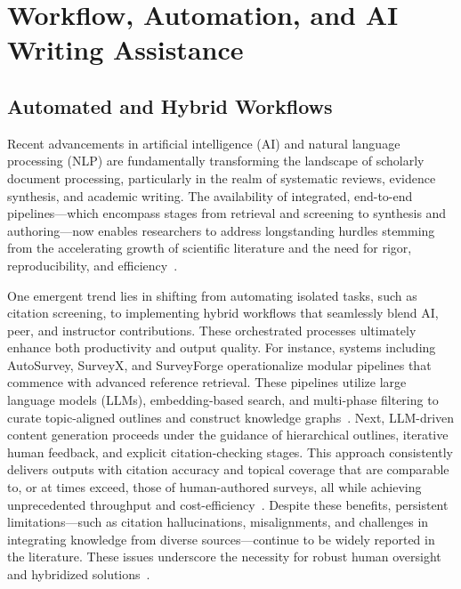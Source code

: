 \section{Workflow, Automation, and AI Writing Assistance}

\subsection{Automated and Hybrid Workflows}

Recent advancements in artificial intelligence (AI) and natural language processing (NLP) are fundamentally transforming the landscape of scholarly document processing, particularly in the realm of systematic reviews, evidence synthesis, and academic writing. The availability of integrated, end-to-end pipelines—which encompass stages from retrieval and screening to synthesis and authoring—now enables researchers to address longstanding hurdles stemming from the accelerating growth of scientific literature and the need for rigor, reproducibility, and efficiency~\cite{ref10,ref11,ref12,ref28,ref29,ref30,ref31,ref35,ref36,ref37,ref38,ref39,ref46,ref47,ref49,ref51,ref62,ref76,ref80,ref86,ref88,ref89,ref90,ref91,ref94,ref96,ref97,ref98,ref102,ref108}.

One emergent trend lies in shifting from automating isolated tasks, such as citation screening, to implementing hybrid workflows that seamlessly blend AI, peer, and instructor contributions. These orchestrated processes ultimately enhance both productivity and output quality. For instance, systems including AutoSurvey, SurveyX, and SurveyForge operationalize modular pipelines that commence with advanced reference retrieval. These pipelines utilize large language models (LLMs), embedding-based search, and multi-phase filtering to curate topic-aligned outlines and construct knowledge graphs~\cite{ref10,ref12,ref35,ref76}. Next, LLM-driven content generation proceeds under the guidance of hierarchical outlines, iterative human feedback, and explicit citation-checking stages. This approach consistently delivers outputs with citation accuracy and topical coverage that are comparable to, or at times exceed, those of human-authored surveys, all while achieving unprecedented throughput and cost-efficiency~\cite{ref10,ref12,ref29,ref35,ref46,ref51}. Despite these benefits, persistent limitations—such as citation hallucinations, misalignments, and challenges in integrating knowledge from diverse sources—continue to be widely reported in the literature. These issues underscore the necessity for robust human oversight and hybridized solutions~\cite{ref10,ref11,ref35,ref39,ref46,ref47,ref51,ref62}.

